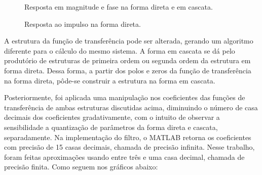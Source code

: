 \documentclass[12pt]{article}
\begin{document}
\begin{figure}[H]
\caption{Resposta em magnitude e fase na forma direta e em cascata.}
\label{casdir1}
\end{figure}


\begin{figure}[H]
\caption{Resposta ao impulso na forma direta.}
\label{respimp}
\end{figure}

A estrutura da fun\c c\~ao de transfer\^encia pode ser alterada, gerando um algoritmo diferente para o c\'alculo do mesmo sistema. A forma em cascata se d\'a pelo produt\'orio de estruturas de primeira ordem ou segunda ordem da estrutura em forma direta. Dessa forma, a partir dos polos e zeros da fun\c c\~ao de transfer\^encia na forma direta, p\^ode-se construir a estrutura na forma em cascata.

Posteriormente, foi aplicada uma manipula\c c\~ao nos coeficientes das fun\c c\~oes de transfer\^encia de ambas estruturas discutidas acima, diminuindo o n\'umero de casa decimais dos coeficientes gradativamente, com o intuito de observar a sensibilidade a quantiza\c c\~ao de par\^ametros da forma direta e cascata, separadamente. 
Na implementa\c c\~ao do filtro, o MATLAB retorna os coeficientes com precis\~ao de 15 casas decimais, chamada de precis\~ao infinita. Nesse trabalho, foram feitas aproxima\c c\~oes usando entre tr\^es e uma casa decimal, chamada de precis\~ao finita. Como seguem  nos gr\'aficos abaixo:
\end{document}
